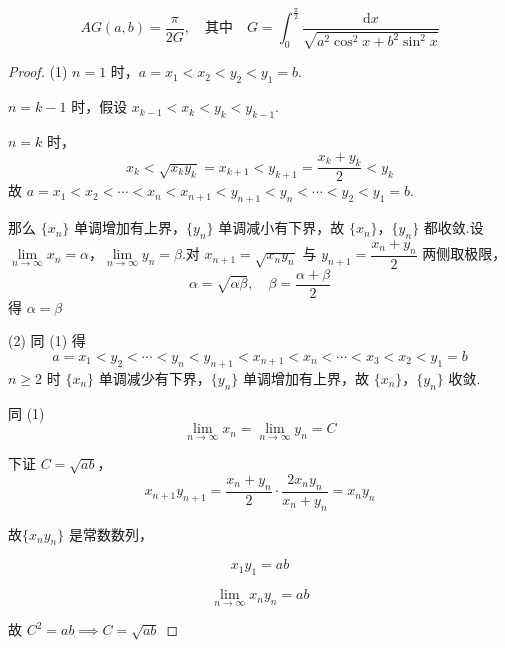 \[
AG(a, b) = \frac{\pi}{2G}, \quad \text{其中} \quad G = \int_0^{\frac{\pi}{2}} \dfrac{\mathrm{d} x}{\sqrt{a^2 \cos^2 x + b^2 \sin^2 x}}
\]
\begin{proof}
	(1) $n=1$ 时，$a = x_1 < x_2 < y_2 < y_1 = b$.
	
	$n = k-1$ 时，假设 $x_{k-1} < x_k < y_k < y_{k-1}$.
	
	$n = k$ 时，
	\[
	x_k < \sqrt{x_k y_k} = x_{k+1} < y_{k+1} = \frac{x_k + y_k}{2} < y_k
	\]
	故 $a = x_1 < x_2 < \cdots < x_n < x_{n+1} < y_{n+1} < y_n < \cdots < y_2 < y_1 = b$.
	
	那么 $\{x_n\}$ 单调增加有上界，$ \{y_n\}$ 单调减小有下界，故 $\{x_n\}$，$ \{y_n\}$ 都收敛.设 $\lim\limits_{n \to \infty} x_n = \alpha$，$\lim\limits_{n \to \infty} y_n = \beta$.对 $x_{n+1} = \sqrt{x_n y_n}$ 与 $y_{n+1} = \dfrac{x_n + y_n}{2}$ 两侧取极限，
	\[
	\alpha = \sqrt{\alpha \beta}, \quad \beta = \frac{\alpha + \beta}{2}
	\]
	得 $\alpha = \beta$
	
	(2) 同 (1) 得
	\[
	a = x_1 < y_2 < \cdots < y_n < y_{n+1} < x_{n+1} < x_n < \cdots < x_3 < x_2 < y_1 = b
	\]
	$n \geqslant 2$ 时 $\{x_n\}$ 单调减少有下界，$ \{y_n\}$ 单调增加有上界，故 $\{x_n\}$，$ \{y_n\}$ 收敛.
	
	同 (1)
	\[
	\lim_{n \to \infty} x_n = \lim_{n \to \infty} y_n = C
	\]
	
	下证 $C = \sqrt{ab}$，
	\[x_{n+1} y_{n+1} = \frac{x_n + y_n}{2} \cdot \dfrac{2x_ny_n}{x_n+y_n} = x_n y_n\]
	
	
	
	故$\{x_n y_n\}$ 是常数数列，
	
	\[
	x_1 y_1 = ab
	\]
	
	\[
	\lim_{n \to \infty} x_n y_n = ab
	\]
	
	故 $C^2 = ab \implies C = \sqrt{ab} $
	
\end{proof}

